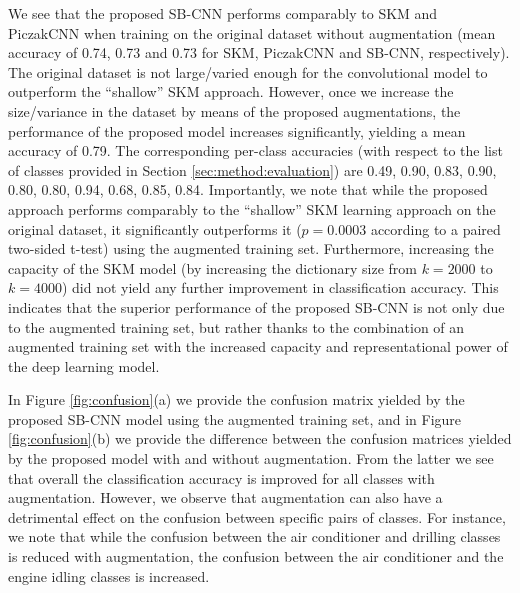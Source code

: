 \documentclass[journal,pdf]{IEEEtran}
\begin{document}
We see that the proposed SB-CNN performs comparably to SKM and PiczakCNN when training on the original dataset without augmentation (mean accuracy of 0.74, 0.73 and 0.73 for SKM, PiczakCNN and SB-CNN, respectively). The original dataset is not large/varied enough for the convolutional model to outperform the ``shallow'' SKM approach. However, once we increase the size/variance in the dataset by means of the proposed augmentations, the performance of the proposed model increases significantly, yielding a mean accuracy of 0.79. 
The corresponding per-class accuracies (with respect to the list of classes provided in Section 
\ref{sec:method:evaluation}) are 0.49, 0.90, 0.83, 0.90, 0.80, 0.80, 0.94, 0.68, 0.85, 0.84.
Importantly, we note that while the proposed approach performs comparably to the ``shallow'' SKM learning approach on the original dataset, it significantly outperforms it ($p = 0.0003$ according to a paired two-sided t-test) using the augmented training set. 
Furthermore, increasing the capacity of the SKM model (by increasing the dictionary size from $k=2000$ to $k=4000$) did not yield any further improvement in classification accuracy.
This indicates that the superior performance of the proposed SB-CNN is not only due to the augmented training set, but rather thanks to the combination of an augmented training set with the increased capacity and representational power of the deep learning model. 

In Figure \ref{fig:confusion}(a) we provide the confusion matrix yielded by the proposed SB-CNN model using the augmented training set, and in Figure \ref{fig:confusion}(b) we provide the difference between the confusion matrices yielded by the proposed model with and without augmentation. 
From the latter we see that 
overall the classification accuracy is improved for all classes with augmentation. 
However, we observe that augmentation can also have a detrimental effect on the confusion between specific pairs of classes. For instance, we note that while the confusion between the air conditioner and drilling classes is reduced with augmentation, the confusion between the air conditioner and the engine idling classes is increased.
\end{document}
